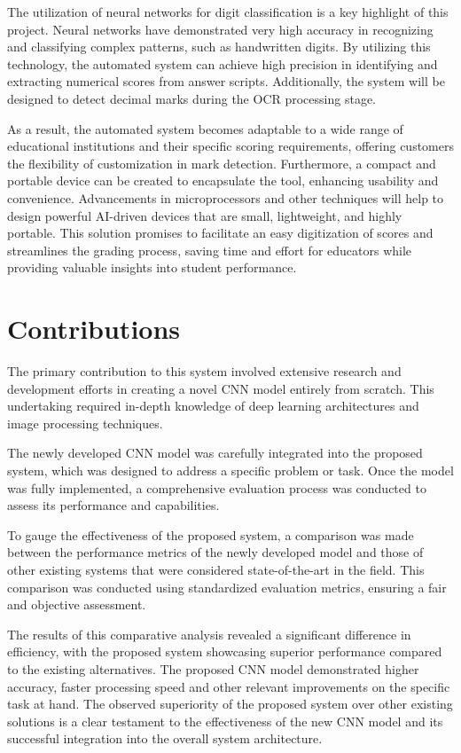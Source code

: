 \noindent The utilization of neural networks for digit classification is a key highlight of this project. Neural networks have demonstrated very high accuracy in recognizing and classifying complex patterns, such as handwritten digits. By utilizing this technology, the automated system can achieve high precision in identifying and extracting numerical scores from answer scripts. Additionally, the system will be designed to detect decimal marks during the OCR processing stage.

\clearpage

\noindent As a result, the automated system becomes adaptable to a wide range of educational institutions and their specific scoring requirements, offering customers the flexibility of customization in mark detection. Furthermore, a compact and portable device can be created to encapsulate the tool, enhancing usability and convenience. Advancements in microprocessors and other techniques will help to design powerful AI-driven devices that are small, lightweight, and highly portable. This solution promises to facilitate an easy digitization of scores and streamlines the grading process, saving time and effort for educators while providing valuable insights into student performance.

\section{Contributions}

\noindent The primary contribution to this system involved extensive research and development efforts in creating a novel CNN model entirely from scratch. This undertaking required in-depth knowledge of deep learning architectures and image processing techniques.

\noindent The newly developed CNN model was carefully integrated into the proposed system, which was designed to address a specific problem or task. Once the model was fully implemented, a comprehensive evaluation process was conducted to assess its performance and capabilities.

\noindent To gauge the effectiveness of the proposed system, a comparison was made between the performance metrics of the newly developed model and those of other existing systems that were considered state-of-the-art in the field. This comparison was conducted using standardized evaluation metrics, ensuring a fair and objective assessment.

\noindent The results of this comparative analysis revealed a significant difference in efficiency, with the proposed system showcasing superior performance compared to the existing alternatives. The proposed CNN model demonstrated higher accuracy, faster processing speed and other relevant improvements on the specific task at hand. The observed superiority of the proposed system over other existing solutions is a clear testament to the effectiveness of the new CNN model and its successful integration into the overall system architecture.